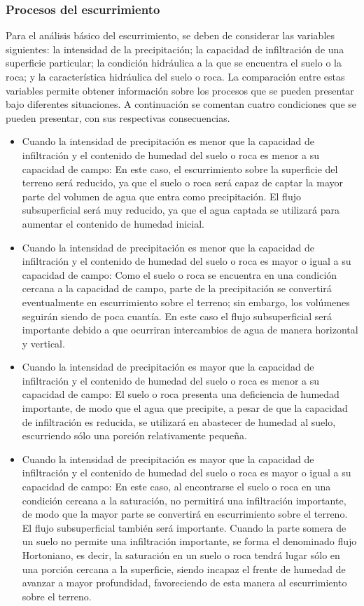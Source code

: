 \documentclass[10pt,a4paper, twoside]{report}
\begin{document}
\subsubsection{Procesos del escurrimiento}
\label{subsec:procEscurr}

Para el análisis básico del escurrimiento, se deben de considerar las variables siguientes: la intensidad de la precipitación; la capacidad de infiltración de una superficie particular; la condición hidráulica a la que se encuentra el suelo o la roca; y la característica hidráulica del suelo o roca. La comparación entre estas variables permite obtener información sobre los procesos que se pueden presentar bajo diferentes situaciones. A 
continuación se comentan cuatro condiciones que se pueden presentar, con sus respectivas consecuencias. 

\begin{itemize}
\item Cuando la intensidad de precipitación es menor que la capacidad de infiltración y el contenido de humedad del suelo o roca es menor a su capacidad de campo: En este caso, el escurrimiento sobre la superficie del terreno será reducido, ya que el suelo o roca será capaz de captar la mayor parte del volumen de agua que entra como precipitación. El flujo subsuperficial será muy reducido, ya que el agua captada se utilizará para aumentar el contenido de humedad inicial. 
\item Cuando la intensidad de precipitación es menor que la capacidad de infiltración y el contenido de humedad del suelo o roca es mayor o igual a su capacidad de campo: Como el suelo o roca se encuentra en una condición cercana a la capacidad de campo, parte de la precipitación se convertirá eventualmente en escurrimiento sobre el terreno; sin embargo, los volúmenes seguirán siendo de poca cuantía. En este caso el flujo subsuperficial será importante debido a que ocurriran intercambios de agua de manera horizontal y vertical.
\item Cuando la intensidad de precipitación es mayor que la capacidad de infiltración y el contenido de humedad del suelo o roca es menor a su capacidad de campo: El suelo o roca presenta una deficiencia de humedad importante, de modo que el agua  que precipite, a pesar de que la capacidad de infiltración es reducida, se utilizará en abastecer de humedad al suelo, escurriendo sólo una porción relativamente pequeña. 
\item Cuando la intensidad de precipitación es mayor que la capacidad de infiltración y el contenido de humedad del suelo o roca es mayor o igual a su capacidad de campo: En este caso, al encontrarse el suelo o roca en una condición cercana a la saturación, no permitirá una infiltración importante, de modo que la mayor parte se convertirá en escurrimiento sobre el terreno. El flujo subsuperficial también será importante. Cuando la parte somera de un suelo no permite una infiltración importante, se forma el denominado flujo Hortoniano, es decir, la saturación en un suelo o roca tendrá lugar sólo en una porción cercana a la superficie, siendo incapaz el frente de humedad  de avanzar a mayor profundidad, favoreciendo de esta manera al escurrimiento sobre el terreno.
\end{itemize}
\end{document}
